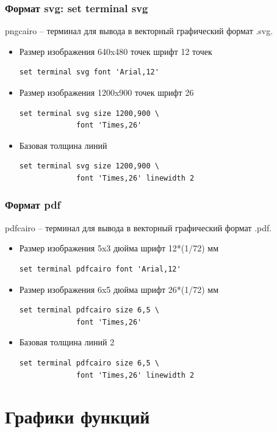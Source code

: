 \documentclass[12pt, compress]{beamer}
\renewcommand{\emph}[1]{\textcolor{dark-blue}{#1}}
\begin{document}
\begin{frame}[c,fragile]
\frametitle{Формат svg: \emph{set terminal svg}}
\emph{pngcairo} -- терминал для вывода в векторный графический формат \emph{.svg}.

\vspace{10pt}
\begin{itemize}
\item Размер изображения 640x480 точек шрифт 12 точек
\begin{lstlisting}
set terminal svg font 'Arial,12'
\end{lstlisting}
\item Размер изображения 1200x900 точек шрифт 26
\begin{lstlisting}
set terminal svg size 1200,900 \ 
             font 'Times,26'
\end{lstlisting}
\item Базовая толщина линий
\begin{lstlisting}
set terminal svg size 1200,900 \ 
             font 'Times,26' linewidth 2
\end{lstlisting}
\end{itemize}
\end{frame}


\begin{frame}[c,fragile]
\frametitle{Формат pdf}
\emph{pdfcairo} -- терминал для вывода в векторный графический формат \emph{.pdf}.

\vspace{10pt}
\begin{itemize}
\item Размер изображения 5x3 дюйма шрифт 12*(1/72) мм
\begin{lstlisting}
set terminal pdfcairo font 'Arial,12'
\end{lstlisting}
\item Размер изображения 6x5 дюйма шрифт 26*(1/72) мм
\begin{lstlisting}
set terminal pdfcairo size 6,5 \ 
             font 'Times,26'
\end{lstlisting}
\item Базовая толщина линий 2
\begin{lstlisting}
set terminal pdfcairo size 6,5 \ 
             font 'Times,26' linewidth 2
\end{lstlisting}
\end{itemize}
\end{frame}


\section{Графики функций}
\end{document}
